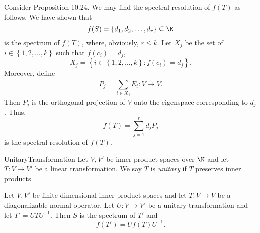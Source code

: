 \documentclass[linearalgebra]{subfiles}
\begin{document}
    \begin{remark}
        Consider Proposition 10.24. We may find the spectral resolution of $f(T)$ as follows. We have shown that
        \begin{equation*}
            f(S) = \left\lbrace d_1,d_2,\ldots,d_r \right\rbrace \subseteq\K
        \end{equation*}
        is the spectrum of $f(T)$, where, obviously, $r\leq k$. Let $X_j$ be the set of $i\in\left\lbrace 1,2,\ldots,k \right\rbrace$ such that $f\left( c_i \right) =d_j$,
        \begin{equation*}
            X_j = \left\lbrace i\in\left\lbrace 1,2,\ldots,k \right\rbrace : f\left( c_i \right) = d_j \right\rbrace .
        \end{equation*}
        Moreover, define
        \begin{equation*}
            P_j = \sum^{}_{i\in X_j} E_i :V\to V.
        \end{equation*}
        Then $P_j$ is the orthogonal projection of $V$ onto the eigenspace corresponding to $d_j$. Thus,
        \begin{equation*}
            f(T) = \sum^{r}_{j=1} d_jP_j
        \end{equation*}
        is the spectral resolution of $f(T)$.
    \end{remark}

    \begin{definition}{Unitary}{Transformation}
        Let $V, V'$ be inner product spaces over $\K$ and let $T:V\to V'$ be a linear transformation. We say $T$ is \emph{unitary} if $T$ preserves inner products.
    \end{definition}

    \begin{prop}{}
        Let $V,V'$ be finite-dimensional inner product spaces and let $T:V\to V$ be a diagonalizable normal operator. Let $U:V\to V'$ be a unitary transformation and let $T' = UTU^{-1}$. Then $S$ is the spectrum of $T'$ and
        \begin{equation*}
            f\left( T' \right) = Uf(T)U^{-1}.
        \end{equation*}
    \end{prop}
\end{document}
